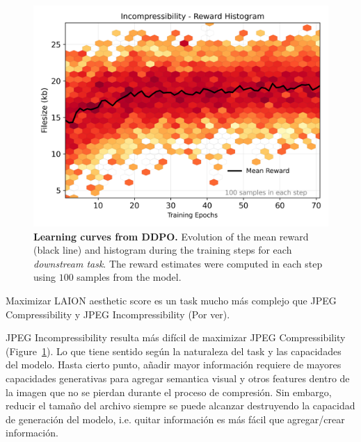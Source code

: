 \begin{figure}[ht]
\begin{minipage}{0.5\textwidth}
  \end{minipage}\hfill
  \begin{minipage}{0.5\textwidth}
      \centering
      \includegraphics[width=1\textwidth]{img/results/reward_hist-jpeg-incompressibility.png} %
  \end{minipage}
  \vspace{-8pt}  %
    \captionsetup{width=\textwidth} %
    \caption{\textbf{Learning curves from DDPO.} Evolution of the mean reward (black line) and histogram during the training steps for each \textit{downstream task}. The reward estimates were computed in each step using $100$ samples from the model.}
  \label{fig:reward_hist} %
\end{figure}

Maximizar LAION aesthetic score es un task mucho más complejo que JPEG Compressibility y JPEG Incompressibility (Por ver).

JPEG Incompressibility resulta más difícil de maximizar JPEG Compressibility
(Figure~\ref{fig:reward_hist}). Lo que tiene sentido según la naturaleza del
task y las capacidades del modelo. Hasta cierto punto, añadir mayor información 
requiere de mayores capacidades generativas para agregar semantica visual y 
otros features dentro de la imagen que no se pierdan durante el proceso de
compresión. Sin embargo, reducir el tamaño del archivo siempre se puede
alcanzar destruyendo la capacidad de generación del modelo, i.e. quitar
información es más fácil que agregar/crear información.


